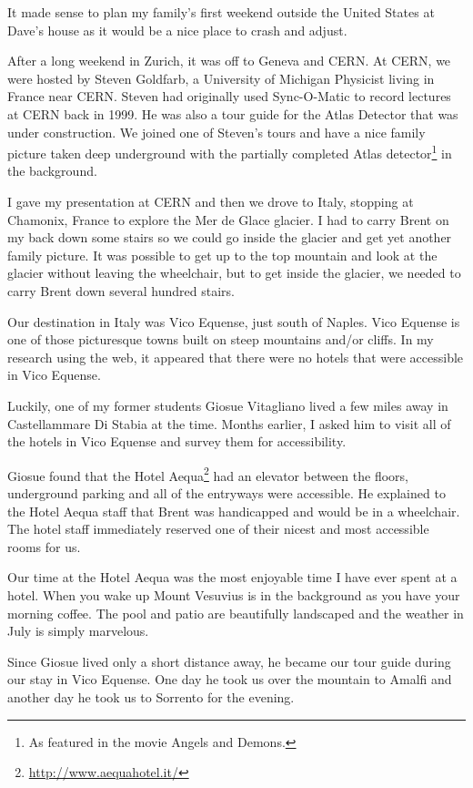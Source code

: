 \documentclass[12pt]{book}
\begin{document}
It made sense to plan my family's first weekend outside the
United States at Dave's house as it would be a nice place to
crash and adjust.

After a long weekend in Zurich, it was off to Geneva and CERN.
At CERN, we were hosted by Steven Goldfarb, a University
of Michigan Physicist living in France near CERN.
Steven had originally used Sync-O-Matic
to record lectures at CERN back in 1999.  He
was also a tour guide for the Atlas Detector that
was under construction.  We joined one of Steven's tours
and have a nice family picture taken deep underground
with the partially completed Atlas detector\footnote{As featured in the movie
Angels and Demons.} in the background.

I gave my presentation at CERN and then we drove
to Italy, stopping at Chamonix, France
to explore the Mer de Glace glacier.  I had to carry Brent
on my back down some stairs so we could go inside
the glacier and get yet another family picture.
It was possible to get up to the top mountain and look
at the glacier without leaving the wheelchair, but
to get inside the glacier, we needed to carry Brent
down several hundred stairs.

Our destination in Italy was Vico Equense, just south
of Naples.   Vico Equense is one of those picturesque
towns built on steep mountains and\slash or cliffs.  In
my research using the web, it appeared that there
were no hotels that were accessible in Vico Equense.

Luckily, one of my former students Giosue Vitagliano
lived a few miles away
in Castellammare Di Stabia
at the time.  Months earlier, I asked him to
visit all of the hotels in Vico Equense and
survey them for accessibility.

Giosue found that the
Hotel Aequa\footnote{\url{http://www.aequahotel.it/}}
had an elevator
between the floors, underground parking and all
of the entryways were accessible.
He explained to the Hotel Aequa staff that
Brent was handicapped and would be in a wheelchair.  The
hotel staff immediately reserved one of their nicest
and most accessible rooms for us.

Our time at the Hotel Aequa was the most enjoyable
time I have ever spent at a hotel.  When you wake up
Mount Vesuvius is in the background as you have your
morning coffee.  The pool and patio are beautifully
landscaped and the weather in July is simply
marvelous.

Since Giosue lived only a short distance away, he became our
tour guide during our stay in Vico Equense.  One
day he took us over the mountain to Amalfi and
another day he took us to Sorrento for the evening.
\end{document}
